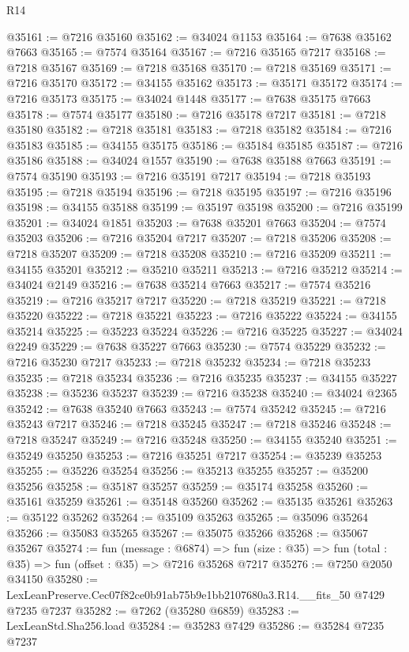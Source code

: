 \begin{lexlean}{R14}
\begin{coremodule}
@35161 := @7216 @35160
@35162 := @34024 @1153
@35164 := @7638 @35162 @7663
@35165 := @7574 @35164
@35167 := @7216 @35165 @7217
@35168 := @7218 @35167
@35169 := @7218 @35168
@35170 := @7218 @35169
@35171 := @7216 @35170
@35172 := @34155 @35162
@35173 := @35171 @35172
@35174 := @7216 @35173
@35175 := @34024 @1448
@35177 := @7638 @35175 @7663
@35178 := @7574 @35177
@35180 := @7216 @35178 @7217
@35181 := @7218 @35180
@35182 := @7218 @35181
@35183 := @7218 @35182
@35184 := @7216 @35183
@35185 := @34155 @35175
@35186 := @35184 @35185
@35187 := @7216 @35186
@35188 := @34024 @1557
@35190 := @7638 @35188 @7663
@35191 := @7574 @35190
@35193 := @7216 @35191 @7217
@35194 := @7218 @35193
@35195 := @7218 @35194
@35196 := @7218 @35195
@35197 := @7216 @35196
@35198 := @34155 @35188
@35199 := @35197 @35198
@35200 := @7216 @35199
@35201 := @34024 @1851
@35203 := @7638 @35201 @7663
@35204 := @7574 @35203
@35206 := @7216 @35204 @7217
@35207 := @7218 @35206
@35208 := @7218 @35207
@35209 := @7218 @35208
@35210 := @7216 @35209
@35211 := @34155 @35201
@35212 := @35210 @35211
@35213 := @7216 @35212
@35214 := @34024 @2149
@35216 := @7638 @35214 @7663
@35217 := @7574 @35216
@35219 := @7216 @35217 @7217
@35220 := @7218 @35219
@35221 := @7218 @35220
@35222 := @7218 @35221
@35223 := @7216 @35222
@35224 := @34155 @35214
@35225 := @35223 @35224
@35226 := @7216 @35225
@35227 := @34024 @2249
@35229 := @7638 @35227 @7663
@35230 := @7574 @35229
@35232 := @7216 @35230 @7217
@35233 := @7218 @35232
@35234 := @7218 @35233
@35235 := @7218 @35234
@35236 := @7216 @35235
@35237 := @34155 @35227
@35238 := @35236 @35237
@35239 := @7216 @35238
@35240 := @34024 @2365
@35242 := @7638 @35240 @7663
@35243 := @7574 @35242
@35245 := @7216 @35243 @7217
@35246 := @7218 @35245
@35247 := @7218 @35246
@35248 := @7218 @35247
@35249 := @7216 @35248
@35250 := @34155 @35240
@35251 := @35249 @35250
@35253 := @7216 @35251 @7217
@35254 := @35239 @35253
@35255 := @35226 @35254
@35256 := @35213 @35255
@35257 := @35200 @35256
@35258 := @35187 @35257
@35259 := @35174 @35258
@35260 := @35161 @35259
@35261 := @35148 @35260
@35262 := @35135 @35261
@35263 := @35122 @35262
@35264 := @35109 @35263
@35265 := @35096 @35264
@35266 := @35083 @35265
@35267 := @35075 @35266
@35268 := @35067 @35267
@35274 := fun (message : @6874) =>
  fun (size : @35) => fun (total : @35) => fun (offset : @35) => @7216 @35268 @7217
@35276 := @7250 @2050 @34150
@35280 := LexLeanPreserve.Cec07f82ce0b91ab75b9e1bb2107680a3.R14.__fits_50 @7429 @7235 @7237
@35282 := @7262 (@35280 @6859)
@35283 := LexLeanStd.Sha256.load
@35284 := @35283 @7429
@35286 := @35284 @7235 @7237

\end{coremodule}
\end{lexlean}
